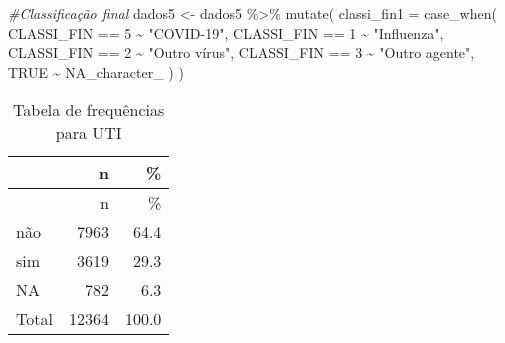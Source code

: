 \documentclass[
]{article}
\newenvironment{Shaded}{\begin{snugshade}}{\end{snugshade}}
\newcommand{\AttributeTok}[1]{\textcolor[rgb]{0.77,0.63,0.00}{#1}}
\newcommand{\CommentTok}[1]{\textcolor[rgb]{0.56,0.35,0.01}{\textit{#1}}}
\newcommand{\ConstantTok}[1]{\textcolor[rgb]{0.00,0.00,0.00}{#1}}
\newcommand{\DecValTok}[1]{\textcolor[rgb]{0.00,0.00,0.81}{#1}}
\newcommand{\FunctionTok}[1]{\textcolor[rgb]{0.00,0.00,0.00}{#1}}
\newcommand{\NormalTok}[1]{#1}
\newcommand{\OtherTok}[1]{\textcolor[rgb]{0.56,0.35,0.01}{#1}}
\newcommand{\SpecialCharTok}[1]{\textcolor[rgb]{0.00,0.00,0.00}{#1}}
\newcommand{\StringTok}[1]{\textcolor[rgb]{0.31,0.60,0.02}{#1}}
\begin{document}
\begin{Shaded}
\begin{Highlighting}[]
\CommentTok{\#Classificação final}
\NormalTok{dados5 }\OtherTok{\textless{}{-}}
\NormalTok{  dados5 }\SpecialCharTok{\%\textgreater{}\%} \FunctionTok{mutate}\NormalTok{(}
    \AttributeTok{classi\_fin1 =} \FunctionTok{case\_when}\NormalTok{(}
\NormalTok{      CLASSI\_FIN }\SpecialCharTok{==} \DecValTok{5} \SpecialCharTok{\textasciitilde{}} \StringTok{"COVID{-}19"}\NormalTok{,}
\NormalTok{      CLASSI\_FIN }\SpecialCharTok{==} \DecValTok{1} \SpecialCharTok{\textasciitilde{}} \StringTok{"Influenza"}\NormalTok{,}
\NormalTok{      CLASSI\_FIN }\SpecialCharTok{==} \DecValTok{2} \SpecialCharTok{\textasciitilde{}} \StringTok{"Outro vírus"}\NormalTok{,}
\NormalTok{      CLASSI\_FIN }\SpecialCharTok{==} \DecValTok{3} \SpecialCharTok{\textasciitilde{}} \StringTok{"Outro agente"}\NormalTok{,}
      \ConstantTok{TRUE} \SpecialCharTok{\textasciitilde{}} \ConstantTok{NA\_character\_}
\NormalTok{    )}
\NormalTok{  )}
\end{Highlighting}
\end{Shaded}

\begin{Shaded}
\end{Shaded}

\begin{longtable}[]{@{}lrr@{}}
\caption{Tabela de frequências para UTI}\tabularnewline
\toprule
& n & \% \\
\midrule
\endfirsthead
\toprule
& n & \% \\
\midrule
\endhead
não & 7963 & 64.4 \\
sim & 3619 & 29.3 \\
NA & 782 & 6.3 \\
Total & 12364 & 100.0 \\
\bottomrule
\end{longtable}
\end{document}
